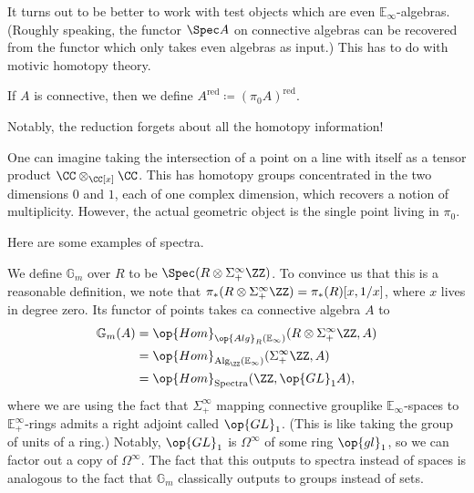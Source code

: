 \documentclass[../notes.tex]{subfiles}
\begin{document}
\begin{remark}
	It turns out to be better to work with test objects which are even $\mathbb E_\infty$-algebras. (Roughly speaking, the functor $\Spec A$ on connective algebras can be recovered from the functor which only takes even algebras as input.) This has to do with motivic homotopy theory.
\end{remark}
\begin{definition}[reduction]
	If $A$ is connective, then we define $A^{\mathrm{red}}\coloneqq(\pi_0A)^{\mathrm{red}}$.
\end{definition}
Notably, the reduction forgets about all the homotopy information!
\begin{example}
	One can imagine taking the intersection of a point on a line with itself as a tensor product $\CC\otimes_{\CC[x]}\CC$. This has homotopy groups concentrated in the two dimensions $0$ and $1$, each of one complex dimension, which recovers a notion of multiplicity. However, the actual geometric object is the single point living in $\pi_0$.
\end{example}
Here are some examples of spectra.
\begin{example}
	We define $\mathbb G_m$ over $R$ to be $\Spec(R\otimes\Sigma^\infty_+\ZZ)$. To convince us that this is a reasonable definition, we note that $\pi_*(R\otimes\Sigma_+^\infty\ZZ)=\pi_*(R)[x,1/x]$, where $x$ lives in degree zero. Its functor of points takes ca connective algebra $A$ to
	\begin{align*}
		\mathbb G_m(A) &= \op{Hom}_{\op{Alg}_R(\mathbb E_\infty)}(R\otimes\Sigma_+^\infty\ZZ,A) \\
		&= \op{Hom}_{\mathrm{Alg}_\ZZ(\mathbb E_\infty)}(\Sigma_+^\infty\ZZ,A) \\
		&= \op{Hom}_{\mathrm{Spectra}}(\ZZ,\op{GL}_1A),
	\end{align*}
	where we are using the fact that $\Sigma_+^\infty$ mapping connective grouplike $\mathbb E_\infty$-spaces to $\mathbb E_+^\infty$-rings admits a right adjoint called $\op{GL}_1$. (This is like taking the group of units of a ring.) Notably, $\op{GL}_1$ is $\Omega^\infty$ of some ring $\op{gl}_1$, so we can factor out a copy of $\Omega^\infty$. The fact that this outputs to spectra instead of spaces is analogous to the fact that $\mathbb G_m$ classically outputs to groups instead of sets. %
\end{example}
\end{document}
